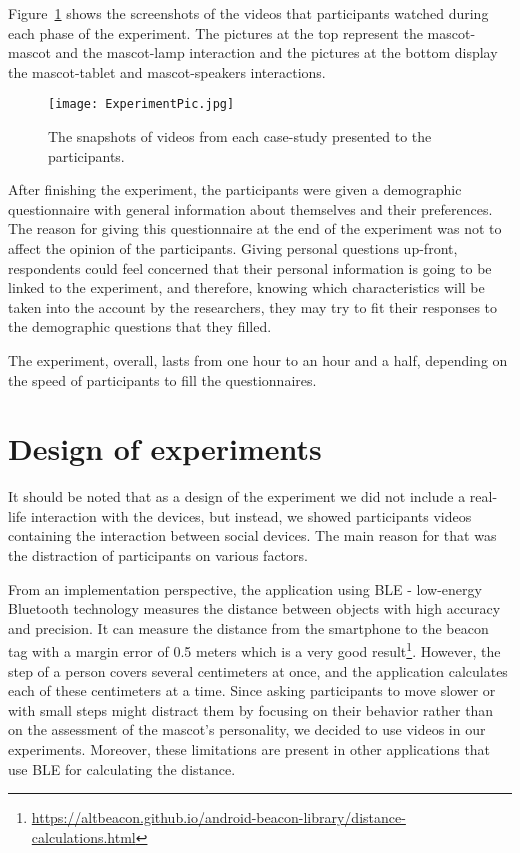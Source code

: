 Figure~\ref{fig:ExperimentPic} shows the screenshots of the videos that
participants watched during each phase of the experiment.
The pictures at the top represent the mascot-mascot and the mascot-lamp interaction
and the pictures at the bottom display the mascot-tablet and mascot-speakers interactions.

\begin{figure}[hbt!]
  \centering
  \texttt{[image: ExperimentPic.jpg]}
  \caption[]{The snapshots of videos from each case-study presented to the participants\footnotemark.}
  \label{fig:ExperimentPic}
\end{figure}

After finishing the experiment, the participants were given a demographic questionnaire
with general information about themselves and their preferences.
The reason for giving this questionnaire at the end of the experiment was
not to affect the opinion of the participants.
Giving personal questions up-front, respondents could feel concerned that their personal
information is going to be linked to the experiment, and therefore, knowing which
characteristics will be taken into the account by the researchers, they may try
to fit their responses to the demographic questions that they filled.

The experiment, overall, lasts from one hour to an hour and a half, depending
on the speed of participants to fill the questionnaires.

\section{Design of experiments}
\label{sec:design-of-experiments}

It should be noted that as a design of the experiment we did not include a
real-life interaction with the devices, but instead, we showed participants videos
containing the interaction between social devices.
The main reason for that was the distraction of participants on various factors.

From an implementation perspective, the application using BLE - low-energy Bluetooth
technology measures the distance between objects with high accuracy and precision.
It can measure the distance from the smartphone to the beacon tag with
a margin error of 0.5 meters which is a
very good result\footnote{\url{https://altbeacon.github.io/android-beacon-library/distance-calculations.html}}.
However, the step of a person covers several centimeters at once, and the
application calculates each of these centimeters at a time.
Since asking participants to move slower or with small steps might distract
them by focusing on their behavior rather than on the assessment of the
mascot's personality, we decided to use videos in our experiments.
Moreover, these limitations are present in other applications that use BLE for calculating the distance.

